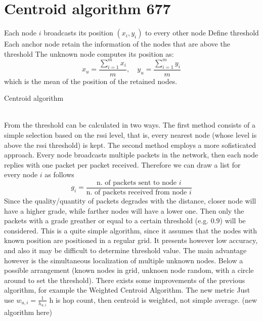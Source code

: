 \documentclass[12pt,twoside]{report}
\begin{document}
\section{Centroid algorithm 677}
\begin{algorithm}[H]
\SetAlgoLined
{}
 Each node $i$ broadcasts its position $(x_i,y_i)$ to every other node\;
 Define threshold\;
 Each anchor node retain the information of the nodes that are above the threshold\;
 The unknown node computes its position as:
 \begin{equation}
     x_u=\frac{\sum_{i=1}^mx_i}{m},\quad y_u=\frac{\sum_{i=1}^my_i}{m}
 \end{equation}
 which is the mean of the position of the retained nodes.
 \caption{Centroid algorithm}
\end{algorithm}
\noindent\\From \cite{878533} the threshold can be calculated in two ways. The first method consists of a simple selection based on the rssi level, that is, every nearest node (whose level is above the rssi threshold) is kept. The second method employs a more sofisticated approach. Every node broadcasts multiple packets in the network, then each node replies with one packet per packet received. Therefore we can draw a list for every node $i$ as follows 
\begin{equation}
    g_i = \frac{\text{n. of packets sent to node $i$}}{\text{n. of packets received from node $i$}}
\end{equation}
Since the quality/quantity of packets degrades with the distance, closer node will have a higher grade, while farther nodes will have a lower one. Then only the packets with a grade greather or equal to a certain threshold (e.g. $0.9$) will be considered. This is a quite simple algorithm, since it assumes that the nodes with known position are positioned in a regular grid. It presents however low accuracy, and also it may be difficult to determine threshold value. The main advantage however is the simultaneous localization of multiple unknown nodes. Below a possible arrangement (known nodes in grid, unknoen node random, with a circle around to set the threshold). There exists some improvements of the previous algorithm, for example the Weighted Centroid Algorithm. The new metric Just use $w_{u,i}=\frac{1}{h_{u,i}}$ h is hop count, then centroid is weighted, not simple average.
(new algorithm here)
\clearpage
\end{document}
